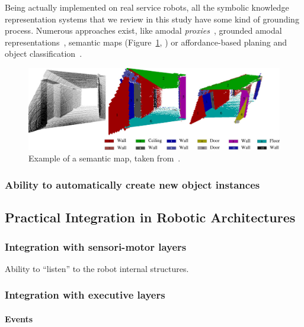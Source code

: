 \documentclass[a4paper, twocolumn]{article}
\begin{document}
Being actually implemented on real service robots, all the symbolic knowledge
representation systems that we review in this study have some kind of grounding
process. Numerous approaches exist, like amodal
\emph{proxies}~\cite{Jacobsson2008}, grounded amodal
representations~\cite{Alami2011, Mavridis2006}, semantic maps
(Figure~\ref{fig|semanticmap}, \cite{Nuechter2008, Galindo2008,Blodow2011}) or
affordance-based planing and object classification~\cite{Lorken2008,
Varadarajan2011}.

\begin{figure}
    \centering
    \includegraphics[width=0.9\columnwidth]{semanticmaps_hertzberg.png}
    \caption{Example of a semantic map, taken from~\cite{Nuechter2008}.}
    \label{fig|semanticmap}
\end{figure}

\subsubsection{Ability to automatically create new object instances}
\label{sect|new-instances}

\subsection{Practical Integration in Robotic Architectures}
\label{sect|integration-robot}

\subsubsection{Integration with sensori-motor layers}
\label{sect|integration-sensorimotor}

Ability to ``listen'' to the robot internal structures.

\subsubsection{Integration with executive layers}
\label{sect|integration-executive-layers}

\paragraph{Events}
\end{document}
